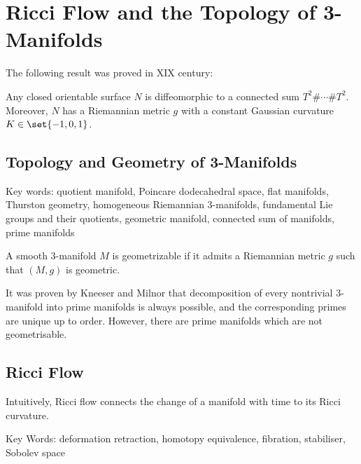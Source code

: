 \documentclass[11pt]{scrartcl}
\begin{document}
\section{Ricci Flow and the Topology of 3-Manifolds}

The following result was proved in XIX century:
\begin{theorem}
  Any closed orientable surface $N$ is diffeomorphic to a connected
  sum $T^2\#\cdots\#T^2$. Moreover, $N$ has a Riemannian metric $g$
  with a constant Gaussian curvature $K\in\set{-1, 0, 1}$.
\end{theorem}

\subsection{Topology and Geometry of 3-Manifolds}

Key words: quotient manifold, Poincare dodecahedral space, flat
manifolds, Thurston geometry, homogeneous Riemannian 3-manifolds,
fundamental Lie groups and their quotients, geometric manifold,
connected sum of manifolds, prime manifolds

\begin{definition}
  A smooth 3-manifold $M$ is geometrizable if it admits a Riemannian
  metric $g$ such that $(M, g)$ is geometric.
\end{definition}

It was proven by Kneeser and Milnor that decomposition of every
nontrivial 3-manifold into prime manifolds is always possible, and the
corresponding primes are unique up to order. However, there are prime
manifolds which are not geometrisable.

\subsection{Ricci Flow}

Intuitively, Ricci flow connects the change of a manifold with time to
its Ricci curvature.

Key Words: deformation retraction, homotopy equivalence, fibration, stabiliser, Sobolev space
\end{document}
